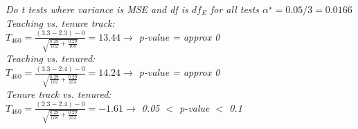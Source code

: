 \documentclass[12pt]{article}
\newcommand{\soln}[2]{\textit{\textcolor{custom_red}{#2}}}{}
\begin{document}
\begin{enumerate}
\soln{3cm}
{Do t tests where variance is MSE and df is $df_E$ for all tests
$\alpha^\star = 0.05 / 3 = 0.0166$ \\
Teaching vs. tenure track: \\
$T_{460} = \frac{(3.3 - 2.3) - 0}{\sqrt{\frac{0.29}{102} + \frac{0.29}{108}}} = 13.44 \rightarrow$ p-value = approx 0 \\
Teaching vs. tenured: \\
$T_{460} = \frac{(3.3 - 2.4) - 0}{\sqrt{\frac{0.29}{102} + \frac{0.29}{253}}} = 14.24 \rightarrow$ p-value = approx 0 \\
Tenure track vs. tenured: \\
$T_{460} = \frac{(2.3 - 2.4) - 0}{\sqrt{\frac{0.29}{108} + \frac{0.29}{253}}} = -1.61 \rightarrow$ 0.05 $<$ p-value $<$ 0.1 
}

\end{enumerate}

\end{document}
